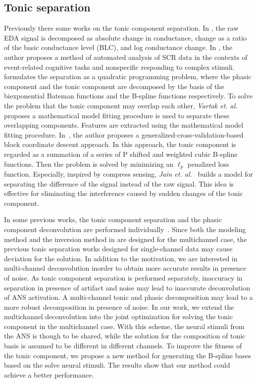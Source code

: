\documentclass[10pt,conference]{ieeeconf}
\begin{document}
\subsection{Tonic separation}
 
Previously there some works on the tonic component separation. In \cite{van1967skin}, the raw EDA signal is decomposed as absolute change in conductance, change as a ratio of the basic conductance level (BLC), and log conductance change. In \cite{green2014development}, the author proposes a method of automated analysis of SCR data in the contexts of event-related cognitive tasks and nonspecific responding to complex stimuli. \cite{greco2014electrodermal} formulates the separation as a quadratic programming problem, where the phasic component and the tonic component are decomposed by the basis of the biexponential Bateman functions and the B-spline functions respectively. To solve the problem that the tonic component may overlap each other, \textit{Vartak et. al.}~\cite{vartak2009estimation} proposes a mathematical model fitting procedure is used to separate these overlapping components. Features are extracted using the mathematical model fitting procedure. In~\cite{amin2019tonic}, the author proposes a generalized-cross-validation-based block coordinate descent approach. In this approach, the tonic component is regarded as a summation of a series of P shifted and weighted cubic B-spline functions. Then the problem is solved by minimizing an $\ell_p$ penalized loss function. Especially, inspired by compress sensing, \textit{Jain et. al.}~\cite{jain2016compressed} builds a model for separating the difference of the signal instead of the raw signal. This idea is effective for eliminating the interference caused by sudden changes of the tonic component.

In some previous works, the tonic component separation and the phasic component deconvolution are performed individually~\cite{greco2014electrodermal,amin2019robust}. Since both the modeling method and the inversion method in \cite{amin2019robust} are designed for the multichannel case, the previous tonic separation works designed for single-channel data may cause deviation for the solution. In addition to the motivation, we are interested in multi-channel deconvolution inorder to obtain more accurate results in presence of noise. As tonic component separation is performed separately, inaccuracy in separation in presence of artifact and noise may lead to inaccurate deconvolution of ANS activation. A multi-channel tonic and phasic decomposition may lead to a more robust decomposition in presence of noise. In our work, we extend the multichannel deconvolution into the joint optimization for solving the tonic component in the multichannel case. With this scheme, the neural stimuli from the ANS is though to be shared, while the solution for the composition of tonic basis is assumed to be different in different channels. To improve the fitness of the tonic component, we propose a new method for generating the B-spline bases based on the solve neural stimuli. The results show that our method could achieve a better performance.
\end{document}
